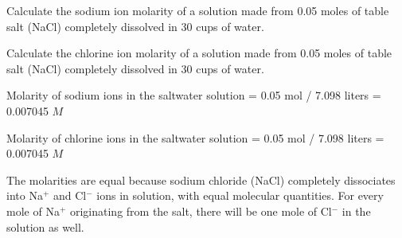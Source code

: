 
Calculate the sodium ion molarity of a solution made from 0.05 moles of table salt (NaCl) completely dissolved in 30 cups of water.

\vskip 10pt

Calculate the chlorine ion molarity of a solution made from 0.05 moles of table salt (NaCl) completely dissolved in 30 cups of water.







Molarity of sodium ions in the saltwater solution = 0.05 mol / 7.098 liters = 0.007045 $M$

\vskip 10pt

Molarity of chlorine ions in the saltwater solution = 0.05 mol / 7.098 liters = 0.007045 $M$

\vskip 10pt

The molarities are equal because sodium chloride (NaCl) completely dissociates into Na$^{+}$ and Cl$^{-}$ ions in solution, with equal molecular quantities.  For every mole of Na$^{+}$ originating from the salt, there will be one mole of Cl$^{-}$ in the solution as well.












